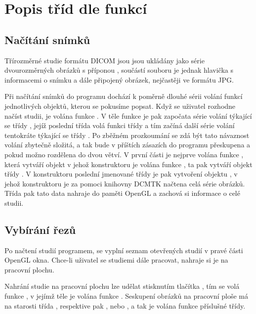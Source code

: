 \section*{Popis tříd dle funkcí}
\subsection*{Načítání snímků}
Třírozměrné studie formátu DICOM jsou jsou ukládány jako série dvourozměrných obrázků s příponou , součástí souboru je jednak hlavička s informacemi o snímku a dále připojený obrázek, nejčastěji ve formátu JPG.

Při načítání snímků do programu dochází k poměrně dlouhé sérii volání funkcí jednotlivých objektů, kterou se pokusíme popsat. Když se uživatel rozhodne načíst studii, je volána funkce .  V těle funkce je pak započata série volání týkající se třídy , jejíž poslední třída volá funkci třídy  a tím začíná další série volání tentokráte týkající se třídy . Po zběžném  prozkoumání se zdá být tato návaznost volání zbytečně složitá, a tak bude v příštích zásazích do programu přeskupena a pokud možno rozdělena do dvou větví. V první části je nejprve volána funkce , která vytváří objekt  v jehož konstruktoru je volána funkce , ta pak vytváří objekt třídy . V konstruktoru poslední jmenované třídy je pak vytvoření objektu , v jehož konstruktoru je za pomoci knihovny DCMTK načtena celá série obrázků. Třída  pak tato data nahraje do paměti OpenGL a zachová si informace o celé studii.

\subsection*{Vybírání řezů}
Po načtení studií programem, se vyplní seznam otevřených studií v pravé části OpenGL okna. Chce-li uživatel se studiemi dále pracovat, nahraje si je na pracovní plochu.

Nahrání studie na pracovní plochu lze udělat stisknutím tlačítka , tím se volá funkce , v jejímž těle je volána funkce . Seskupení obrázků na pracovní ploše má na starosti třída , respektive pak , nebo , a tak je volána funkce  příslušné třídy.

